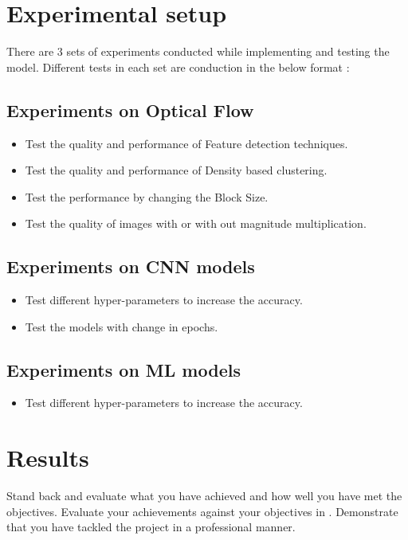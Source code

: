 \section{Experimental setup}
There are 3 sets of experiments conducted while implementing and testing the model. Different tests in each set are conduction in the below format :

\subsection{Experiments on Optical Flow }
 \begin{itemize}
	\item Test the quality and performance of Feature detection techniques.
	\item Test the quality and performance of Density based clustering.
	\item Test the performance by changing the Block Size.
	\item Test the quality of images with or with out magnitude multiplication.
\end{itemize}
\subsection{Experiments on CNN models }
 \begin{itemize}
	\item Test different hyper-parameters to increase the accuracy.
	\item Test the models with change in epochs.
\end{itemize}
\subsection{Experiments on ML models }
 \begin{itemize}
	\item Test different hyper-parameters to increase the accuracy.
\end{itemize}

\section{Results}
Stand back and evaluate what you have achieved and how well you have met the 
objectives. Evaluate your achievements against your objectives in 
. Demonstrate that you have tackled the project in a 
professional manner. 

